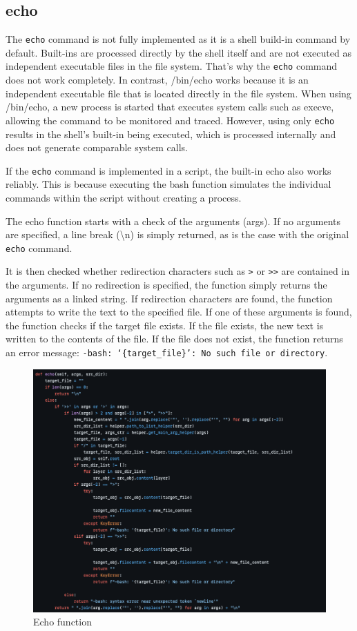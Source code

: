 \subsection{echo}
\label{sub:echo}
The \texttt{echo} command is not fully implemented as it is a shell build-in command by default. Built-ins are processed directly by the shell itself and are not executed as independent executable files in the file system. That's why the \texttt{echo} command does not work completely. 
In contrast, /bin/echo works because it is an independent executable file that is located directly in the file system. When using /bin/echo, a new process is started that executes system calls such as execve, allowing the command to be monitored and traced. However, using only \texttt{echo} results in the shell's built-in being executed, which is processed internally and does not generate comparable system calls.

If the \texttt{echo} command is implemented in a script, the built-in echo also works reliably. This is because executing the bash function simulates the individual commands within the script without creating a process.

The echo function starts with a check of the arguments (args). If no arguments are specified, a line break (\textbackslash n) is simply returned, as is the case with the original \texttt{echo} command.

It is then checked whether redirection characters such as \texttt{>} or \texttt{>>}  are contained in the arguments. If no redirection is specified, the function simply returns the arguments as a linked string. If redirection characters are found, the function attempts to write the text to the specified file. If one of these arguments is found, the function checks if the target file exists. If the file exists, the new text is written to the contents of the file. If the file does not exist, the function returns an error message: \texttt{-bash: ‘\{target\_file\}’: No such file or directory}.

\begin{figure}[H]
    \centering
    \includegraphics[width=1\linewidth]{bilder/echo_code.PNG}
    \caption{Echo function}
\end{figure}

